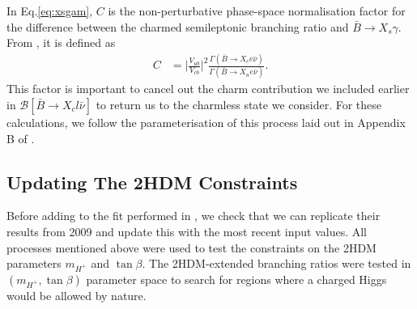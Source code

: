 \documentclass[a4paper,12pt]{article}
\begin{document}
In Eq.\eqref{eq:xsgam}, $C$ is the non-perturbative phase-space normalisation factor for the difference between the charmed semileptonic branching ratio and $\bar{B}\to X_s\gamma$. 
From \cite{bmes}, it is defined as 
\begin{align}
    \label{eq:phasespace}
    C &= \bigg|\frac{V_{ub}}{V_{cb}}\bigg|^2\frac{\Gamma(\bar{B}\to X_ce\bar{\nu})}{\Gamma(\bar{B}\to X_ue\bar{\nu})}.
\end{align}
This factor is important to cancel out the charm contribution we included earlier in $\mathcal{B}[\bar{B}\to X_cl\bar{\nu}]$ to return us to the charmless state we consider.
For these calculations, we follow the parameterisation of this process laid out in Appendix B of \cite{desc}.

\subsection{Updating The 2HDM Constraints}
\label{subsec:fit}
Before adding to the fit performed in \cite{desc}, we check that we can replicate their results from 2009 and update this with the most recent input values. 
All processes mentioned above were used to test the constraints on the 2HDM parameters $m_{H^+}$ and $\tan\beta$. 
The 2HDM-extended branching ratios were tested in $(m_{H^+},\tan\beta)$ parameter space to search for regions where a charged Higgs would be allowed by nature. 
\end{document}
